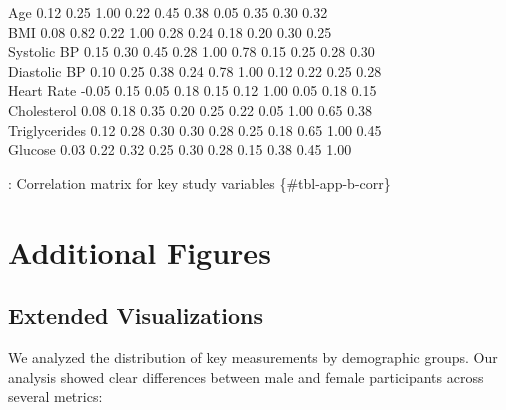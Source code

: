 \documentclass[
  letterpaper,
  oneside,
  openany]{MastersDoctoralThesis}
\begin{document}
Age \textbar{} 0.12 \textbar{} 0.25 \textbar{} 1.00 \textbar{} 0.22
\textbar{} 0.45 \textbar{} 0.38 \textbar{} 0.05 \textbar{} 0.35
\textbar{} 0.30 \textbar{} 0.32 \textbar{}\\
BMI \textbar{} 0.08 \textbar{} 0.82 \textbar{} 0.22 \textbar{} 1.00
\textbar{} 0.28 \textbar{} 0.24 \textbar{} 0.18 \textbar{} 0.20
\textbar{} 0.30 \textbar{} 0.25 \textbar{}\\
Systolic BP \textbar{} 0.15 \textbar{} 0.30 \textbar{} 0.45 \textbar{}
0.28 \textbar{} 1.00 \textbar{} 0.78 \textbar{} 0.15 \textbar{} 0.25
\textbar{} 0.28 \textbar{} 0.30 \textbar{}\\
Diastolic BP\textbar{} 0.10 \textbar{} 0.25 \textbar{} 0.38 \textbar{}
0.24 \textbar{} 0.78 \textbar{} 1.00 \textbar{} 0.12 \textbar{} 0.22
\textbar{} 0.25 \textbar{} 0.28 \textbar{}\\
Heart Rate \textbar{} -0.05 \textbar{} 0.15 \textbar{} 0.05 \textbar{}
0.18 \textbar{} 0.15 \textbar{} 0.12 \textbar{} 1.00 \textbar{} 0.05
\textbar{} 0.18 \textbar{} 0.15 \textbar{}\\
Cholesterol \textbar{} 0.08 \textbar{} 0.18 \textbar{} 0.35 \textbar{}
0.20 \textbar{} 0.25 \textbar{} 0.22 \textbar{} 0.05 \textbar{} 1.00
\textbar{} 0.65 \textbar{} 0.38 \textbar{}\\
Triglycerides\textbar{} 0.12 \textbar{} 0.28 \textbar{} 0.30 \textbar{}
0.30 \textbar{} 0.28 \textbar{} 0.25 \textbar{} 0.18 \textbar{} 0.65
\textbar{} 1.00 \textbar{} 0.45 \textbar{}\\
Glucose \textbar{} 0.03 \textbar{} 0.22 \textbar{} 0.32 \textbar{} 0.25
\textbar{} 0.30 \textbar{} 0.28 \textbar{} 0.15 \textbar{} 0.38
\textbar{} 0.45 \textbar{} 1.00 \textbar{}

: Correlation matrix for key study variables \{\#tbl-app-b-corr\}

\section{Additional Figures}\label{sec-app-b-figures-add}

\subsection{Extended Visualizations}\label{sec-app-b-ext-viz-add}

We analyzed the distribution of key measurements by demographic groups.
Our analysis showed clear differences between male and female
participants across several metrics:
\end{document}
